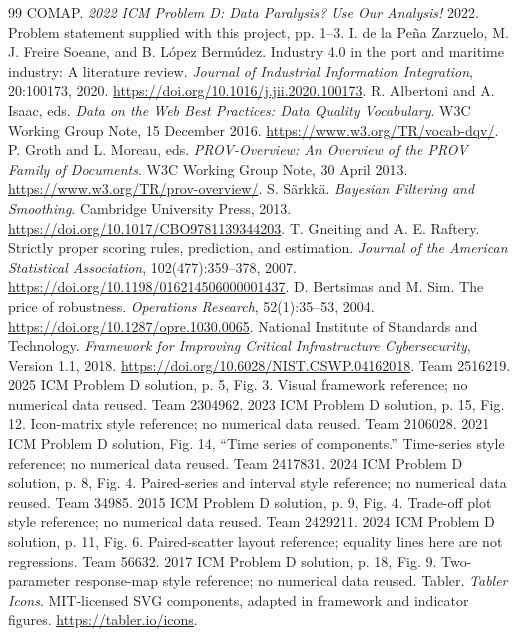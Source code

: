 \begin{thebibliography}{99}
 COMAP. \emph{2022 ICM Problem D: Data Paralysis? Use Our Analysis!} 2022. Problem statement supplied with this project, pp. 1--3.
 I. de la Pe\~na Zarzuelo, M. J. Freire Soeane, and B. L\'opez Berm\'udez. Industry 4.0 in the port and maritime industry: A literature review. \emph{Journal of Industrial Information Integration}, 20:100173, 2020. \url{https://doi.org/10.1016/j.jii.2020.100173}.
 R. Albertoni and A. Isaac, eds. \emph{Data on the Web Best Practices: Data Quality Vocabulary}. W3C Working Group Note, 15 December 2016. \url{https://www.w3.org/TR/vocab-dqv/}.
 P. Groth and L. Moreau, eds. \emph{PROV-Overview: An Overview of the PROV Family of Documents}. W3C Working Group Note, 30 April 2013. \url{https://www.w3.org/TR/prov-overview/}.
 S. S\"arkk\"a. \emph{Bayesian Filtering and Smoothing}. Cambridge University Press, 2013. \url{https://doi.org/10.1017/CBO9781139344203}.
 T. Gneiting and A. E. Raftery. Strictly proper scoring rules, prediction, and estimation. \emph{Journal of the American Statistical Association}, 102(477):359--378, 2007. \url{https://doi.org/10.1198/016214506000001437}.
 D. Bertsimas and M. Sim. The price of robustness. \emph{Operations Research}, 52(1):35--53, 2004. \url{https://doi.org/10.1287/opre.1030.0065}.
 National Institute of Standards and Technology. \emph{Framework for Improving Critical Infrastructure Cybersecurity}, Version 1.1, 2018. \url{https://doi.org/10.6028/NIST.CSWP.04162018}.
 Team 2516219. 2025 ICM Problem D solution, p. 5, Fig. 3. Visual framework reference; no numerical data reused.
 Team 2304962. 2023 ICM Problem D solution, p. 15, Fig. 12. Icon-matrix style reference; no numerical data reused.
 Team 2106028. 2021 ICM Problem D solution, Fig. 14, ``Time series of components.'' Time-series style reference; no numerical data reused.
 Team 2417831. 2024 ICM Problem D solution, p. 8, Fig. 4. Paired-series and interval style reference; no numerical data reused.
 Team 34985. 2015 ICM Problem D solution, p. 9, Fig. 4. Trade-off plot style reference; no numerical data reused.
 Team 2429211. 2024 ICM Problem D solution, p. 11, Fig. 6. Paired-scatter layout reference; equality lines here are not regressions.
 Team 56632. 2017 ICM Problem D solution, p. 18, Fig. 9. Two-parameter response-map style reference; no numerical data reused.
 Tabler. \emph{Tabler Icons}. MIT-licensed SVG components, adapted in framework and indicator figures. \url{https://tabler.io/icons}.
\end{thebibliography}\par
